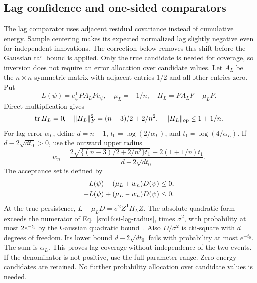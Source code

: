 \subsection{Lag confidence and one-sided comparators}\label{src16:si-lag}
The lag comparator uses adjacent residual covariance instead of cumulative energy. Sample centering makes its expected normalized lag slightly negative even for independent innovations. The correction below removes this shift before the Gaussian tail bound is applied. Only the true candidate is needed for coverage, so inversion does not require an error allocation over candidate values.
Let $A_L$ be the $n\times n$ symmetric matrix with adjacent entries $1/2$ and all other entries zero. Put
\[
 L(\psi)=e_\psi^{\mathsf T}PA_LPe_\psi,\quad
 \mu_L=-1/n,\quad H_L=PA_LP-\mu_LP.
\]
Direct multiplication gives
\[
 \operatorname{tr}H_L=0,\quad
 \|H_L\|_F^2=(n-3)/2+2/n^2,\quad
 \|H_L\|_{\rm op}\le1+1/n.
\]
For lag error $\alpha_L$, define $d=n-1$, $t_0=\log(2/\alpha_L)$, and $t_1=\log(4/\alpha_L)$. If $d-2\sqrt{dt_0}>0$, use the outward upper radius
\begin{equation}\label{src16:si-lag-radius}
 w_n=\frac{2\sqrt{\{(n-3)/2+2/n^2\}t_1}
                +2(1+1/n)t_1}{d-2\sqrt{dt_0}}.
\end{equation}
The acceptance set is defined by
\begin{align}\label{src16:si-lag-set}
 L(\psi)-(\mu_L+w_n)D(\psi)&\le0,\notag\\
 -L(\psi)+(\mu_L-w_n)D(\psi)&\le0.
\end{align}
At the true persistence, $L-\mu_LD=\sigma^2Z^{\mathsf T}H_LZ$. The absolute quadratic form exceeds the numerator of Eq.~\eqref{src16:si-lag-radius}, times $\sigma^2$, with probability at most $2e^{-t_1}$ by the Gaussian quadratic bound~\cite{laurentmassart}. Also $D/\sigma^2$ is chi-square with $d$ degrees of freedom. Its lower bound $d-2\sqrt{dt_0}$ fails with probability at most $e^{-t_0}$. The sum is $\alpha_L$. This proves lag coverage without independence of the two events. If the denominator is not positive, use the full parameter range. Zero-energy candidates are retained. No further probability allocation over candidate values is needed.

